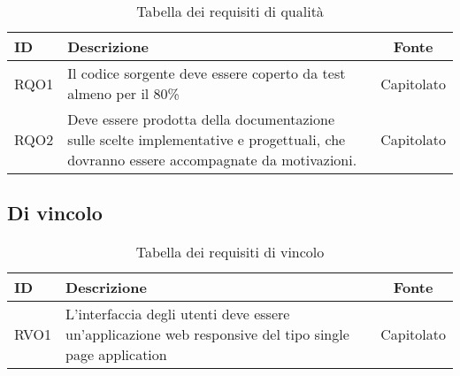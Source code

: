 \begin{table}[H]
	\renewcommand{\arraystretch}{1.5}
	\centering
	\begin{tabularx}{\textwidth}{l|X|c}
		\textbf{ID} & \textbf{Descrizione}                                                                                                                  & \textbf{Fonte} \\
		\hline
		RQO1        & Il codice sorgente deve essere coperto da test almeno per il 80\%                                                                     & Capitolato     \\
		\hline
		RQO2        & Deve essere prodotta della documentazione sulle scelte implementative e progettuali, che dovranno essere accompagnate da motivazioni. & Capitolato     \\
		\hline
	\end{tabularx}
	\caption{Tabella dei requisiti di qualità}
\end{table}

\subsection{Di vincolo}

\begin{table}[H]
	\renewcommand{\arraystretch}{1.5}
	\centering
	\begin{tabularx}{\textwidth}{l|X|c}
		\textbf{ID} & \textbf{Descrizione}                                                                                   & \textbf{Fonte} \\
		\hline
		RVO1        & L'interfaccia degli utenti deve essere un'applicazione web responsive del tipo single page application & Capitolato     \\
		\hline
	\end{tabularx}
	\caption{Tabella dei requisiti di vincolo}
\end{table}
